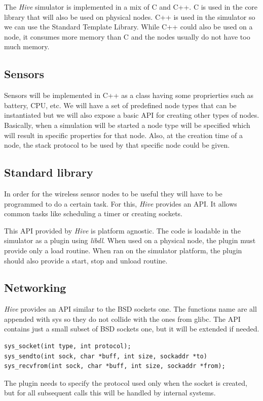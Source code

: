 
The \textit{Hive} simulator is implemented in a mix of C and C++. C is used in the core
library that will also be used on physical nodes. C++ is used in the
simulator so we can use the Standard Template Library. While C++ could also be
used on a node, it consumes more memory than C and the nodes usually do not
have too much memory.

\subsection{Sensors}
Sensors will be implemented in C++ as a class having some proprierties such as
battery, CPU, etc. We will have a set of predefined node types that can be
instantiated but we will also expose a basic API for creating other types of
nodes. Basically, when a simulation will be started a node type will be
specified which will result in specific properties for that node. Also, at the
creation time of a node, the stack protocol to be used by that specific node could be given.

\subsection{Standard library}

In order for the wireless sensor nodes to be useful they will have to be
programmed to do a certain task. For this, \textit{Hive} provides an API. It allows
common tasks like scheduling a timer or creating sockets. 

This API provided by \textit{Hive} is platform agnostic. The code is loadable in the
simulator as a plugin using \textit{libdl}. When used on a physical node, the plugin must
provide only a load routine. When ran on the simulator platform, the plugin
should also provide a start, stop and unload routine.

\subsection{Networking}

\textit{Hive} provides an API similar to the BSD sockets one. The functions name are
all appended with sys so they do not collide with the ones from glibc. The API
contains just a small subset of BSD sockets one, but it will be extended if needed.
\begin{lstlisting}
sys_socket(int type, int protocol);
sys_sendto(int sock, char *buff, int size, sockaddr *to)
sys_recvfrom(int sock, char *buff, int size, sockaddr *from);
\end{lstlisting}
The plugin needs to specify the protocol used only when the socket is created,
but for all subsequent calls this will be handled by internal systems. 

